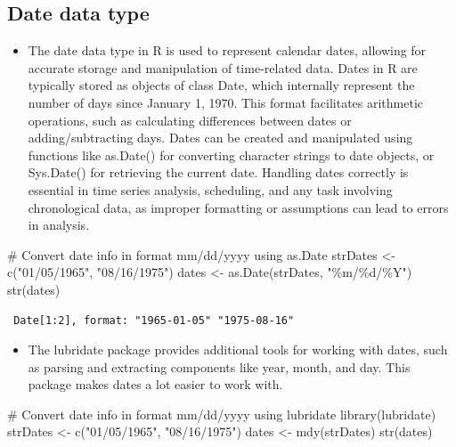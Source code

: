 \documentclass[
  letterpaper,
  DIV=11,
  numbers=noendperiod]{scrreprt}
\newenvironment{Shaded}{\begin{snugshade}}{\end{snugshade}}
\newcommand{\CommentTok}[1]{\textcolor[rgb]{0.37,0.37,0.37}{#1}}
\newcommand{\FunctionTok}[1]{\textcolor[rgb]{0.28,0.35,0.67}{#1}}
\newcommand{\NormalTok}[1]{\textcolor[rgb]{0.00,0.23,0.31}{#1}}
\newcommand{\OtherTok}[1]{\textcolor[rgb]{0.00,0.23,0.31}{#1}}
\newcommand{\StringTok}[1]{\textcolor[rgb]{0.13,0.47,0.30}{#1}}
\providecommand{\tightlist}{%
  \setlength{\itemsep}{0pt}\setlength{\parskip}{0pt}}\usepackage{longtable,booktabs,array}
\begin{document}
\subsection{Date data type}\label{date-data-type}

\begin{itemize}
\tightlist
\item
  The date data type in R is used to represent calendar dates, allowing
  for accurate storage and manipulation of time-related data. Dates in R
  are typically stored as objects of class Date, which internally
  represent the number of days since January 1, 1970. This format
  facilitates arithmetic operations, such as calculating differences
  between dates or adding/subtracting days. Dates can be created and
  manipulated using functions like as.Date() for converting character
  strings to date objects, or Sys.Date() for retrieving the current
  date. Handling dates correctly is essential in time series analysis,
  scheduling, and any task involving chronological data, as improper
  formatting or assumptions can lead to errors in analysis.
\end{itemize}

\begin{Shaded}
\begin{Highlighting}[]
\CommentTok{\# Convert date info in format \textquotesingle{}mm/dd/yyyy\textquotesingle{} using as.Date}
\NormalTok{strDates }\OtherTok{\textless{}{-}} \FunctionTok{c}\NormalTok{(}\StringTok{"01/05/1965"}\NormalTok{, }\StringTok{"08/16/1975"}\NormalTok{)}
\NormalTok{dates }\OtherTok{\textless{}{-}} \FunctionTok{as.Date}\NormalTok{(strDates, }\StringTok{"\%m/\%d/\%Y"}\NormalTok{)}
\FunctionTok{str}\NormalTok{(dates)}
\end{Highlighting}
\end{Shaded}

\begin{verbatim}
 Date[1:2], format: "1965-01-05" "1975-08-16"
\end{verbatim}

\begin{itemize}
\tightlist
\item
  The lubridate package provides additional tools for working with
  dates, such as parsing and extracting components like year, month, and
  day. This package makes dates a lot easier to work with.
\end{itemize}

\begin{Shaded}
\begin{Highlighting}[]
\CommentTok{\# Convert date info in format \textquotesingle{}mm/dd/yyyy\textquotesingle{} using lubridate}
\FunctionTok{library}\NormalTok{(lubridate)}
\NormalTok{strDates }\OtherTok{\textless{}{-}} \FunctionTok{c}\NormalTok{(}\StringTok{"01/05/1965"}\NormalTok{, }\StringTok{"08/16/1975"}\NormalTok{)}
\NormalTok{dates }\OtherTok{\textless{}{-}} \FunctionTok{mdy}\NormalTok{(strDates)}
\FunctionTok{str}\NormalTok{(dates)}
\end{Highlighting}
\end{Shaded}
\end{document}
